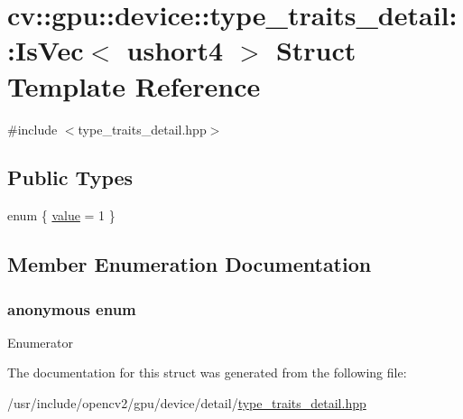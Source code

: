 \hypertarget{structcv_1_1gpu_1_1device_1_1type__traits__detail_1_1IsVec_3_01ushort4_01_4}{\section{cv\-:\-:gpu\-:\-:device\-:\-:type\-\_\-traits\-\_\-detail\-:\-:Is\-Vec$<$ ushort4 $>$ Struct Template Reference}
\label{structcv_1_1gpu_1_1device_1_1type__traits__detail_1_1IsVec_3_01ushort4_01_4}
}


{\ttfamily \#include $<$type\-\_\-traits\-\_\-detail.\-hpp$>$}

\subsection*{Public Types}
\begin{DoxyCompactItemize}
\item 
enum \{ \hyperlink{structcv_1_1gpu_1_1device_1_1type__traits__detail_1_1IsVec_3_01ushort4_01_4_a126acff0b3438069906ca4543f3c0332abcbb2fe6695299d5ce49c10f5d288b16}{value} = 1
 \}
\end{DoxyCompactItemize}


\subsection{Member Enumeration Documentation}
\hypertarget{structcv_1_1gpu_1_1device_1_1type__traits__detail_1_1IsVec_3_01ushort4_01_4_a126acff0b3438069906ca4543f3c0332}{\subsubsection[{anonymous enum}]{\setlength{\rightskip}{0pt plus 5cm}anonymous enum}}\label{structcv_1_1gpu_1_1device_1_1type__traits__detail_1_1IsVec_3_01ushort4_01_4_a126acff0b3438069906ca4543f3c0332}
\begin{Desc}
\item[Enumerator]\par
\begin{description}
\item[{\em 
\hypertarget{structcv_1_1gpu_1_1device_1_1type__traits__detail_1_1IsVec_3_01ushort4_01_4_a126acff0b3438069906ca4543f3c0332abcbb2fe6695299d5ce49c10f5d288b16}{value}\label{structcv_1_1gpu_1_1device_1_1type__traits__detail_1_1IsVec_3_01ushort4_01_4_a126acff0b3438069906ca4543f3c0332abcbb2fe6695299d5ce49c10f5d288b16}
}]\end{description}
\end{Desc}


The documentation for this struct was generated from the following file\-:\begin{DoxyCompactItemize}
\item 
/usr/include/opencv2/gpu/device/detail/\hyperlink{type__traits__detail_8hpp}{type\-\_\-traits\-\_\-detail.\-hpp}\end{DoxyCompactItemize}
